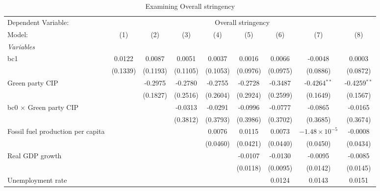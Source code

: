 
\begin{table}[htbp]
   \caption{Examining Overall stringency}
   \centering
   \begin{tabular}{lcccccccc}
      \tabularnewline \midrule \midrule
      Dependent Variable: & \multicolumn{8}{c}{Overall stringency}\\
      Model:                                  & (1)      & (2)      & (3)      & (4)      & (5)      & (6)      & (7)                    & (8)\\  
      \midrule
      \emph{Variables}\\
      bc1                                     & 0.0122   & 0.0087   & 0.0051   & 0.0037   & 0.0016   & 0.0066   & -0.0048                & 0.0003\\   
                                              & (0.1339) & (0.1193) & (0.1105) & (0.1053) & (0.0976) & (0.0975) & (0.0886)               & (0.0872)\\   
      Green party CIP                         &          & -0.2975  & -0.2780  & -0.2755  & -0.2728  & -0.3487  & -0.4264$^{**}$         & -0.4259$^{**}$\\   
                                              &          & (0.1827) & (0.2516) & (0.2604) & (0.2924) & (0.2599) & (0.1649)               & (0.1567)\\   
      bc0 $\times$ Green party CIP            &          &          & -0.0313  & -0.0291  & -0.0996  & -0.0777  & -0.0865                & -0.0165\\   
                                              &          &          & (0.3812) & (0.3793) & (0.3986) & (0.3702) & (0.3685)               & (0.3674)\\   
      Fossil fuel production per capita       &          &          &          & 0.0076   & 0.0115   & 0.0073   & $-1.48\times 10^{-5}$  & -0.0008\\   
                                              &          &          &          & (0.0460) & (0.0421) & (0.0440) & (0.0450)               & (0.0434)\\   
      Real GDP growth                         &          &          &          &          & -0.0107  & -0.0130  & -0.0095                & -0.0085\\   
                                              &          &          &          &          & (0.0118) & (0.0095) & (0.0142)               & (0.0145)\\   
      Unemployment rate                       &          &          &          &          &          & 0.0124   & 0.0143                 & 0.0151\\   

\end{tabular}
\end{table}
